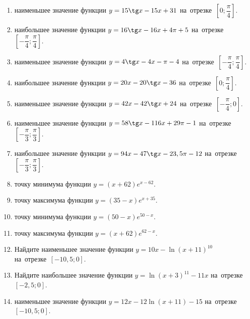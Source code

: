 \documentclass[a4paper,10pt]{article}
\begin{document}
\begin{enumerate}
\item {} наименьшее значение функции $y = 15\tg x-15x+31$ на~отрезке~$\left[0;\dfrac{\pi }{4}\right]$.

\item {} наибольшее значение функции $y=16\tg x-16x+4\pi +5$ на~отрезке~$\left[-\dfrac{\pi }{4};\dfrac{\pi }{4}\right]$.

\item {} наименьшее значение функции $y=4\tg x-4x-\pi -4$ на~отрезке~$\left[-\dfrac{\pi }{4};\dfrac{\pi }{4}\right]$.

\item {} наибольшее значение функции $y = 20x-20\tg x -36$ на~отрезке~$\left[0;\dfrac{\pi }{4}\right]$.

\item {} наименьшее значение функции $y = 42x-42\tg x +24$ на~отрезке~$\left[-\dfrac{\pi }{4};0\right]$.

\item {} наименьшее значение функции $y = 58\tg x-116x+29 \pi -1$ на~отрезке~$\left[-\dfrac{\pi }{3};\dfrac{\pi }{3}\right]$.

\item {} наибольшее значение функции $y = 94x-47\tg x-23,5\pi -12$ на~отрезке~$\left[-\dfrac{\pi }{3};\dfrac{\pi }{3}\right]$.

\item {} точку минимума функции $y = \left(x+62\right)e^{x-62}$.

\item {} точку максимума функции $y = \left(35-x\right)e^{x+35}$.

\item {} точку минимума функции $y = \left(50-x\right)e^{50-x}$.

\item {} точку максимума функции $y = \left(x+62\right)e^{62-x}$.

\item Найдите наименьшее значение функции $y = 10x-\ln \left(x+11\right)^{10}$ на~отрезке~$\left[-10,5;0\right]$.

\item Найдите наибольшее значение функции $y = \ln \left(x+3\right)^{11}-11x$ на~отрезке~$\left[-2,5;0\right]$.

\item {} наименьшее значение функции $y = 12x-12\ln \left(x+11\right) -15$ на~отрезке~$\left[-10,5;0\right]$.


\end{enumerate}
\end{document}
